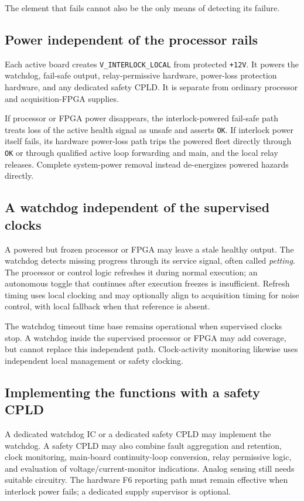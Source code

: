 The element that fails cannot also be the only means of detecting its failure.

\subsection{Power independent of the processor rails}

Each active board creates \texttt{V\_INTERLOCK\_LOCAL} from protected \texttt{+12V}. It powers the watchdog, fail-safe output, relay-permissive hardware, power-loss protection hardware, and any dedicated safety CPLD. It is separate from ordinary processor and acquisition-FPGA supplies.

If processor or FPGA power disappears, the interlock-powered fail-safe path treats loss of the active health signal as unsafe and asserts \texttt{OK}. If interlock power itself fails, its hardware power-loss path trips the powered fleet directly through \texttt{OK} or through qualified active loop forwarding and main, and the local relay releases. Complete system-power removal instead de-energizes powered hazards directly.

\subsection{A watchdog independent of the supervised clocks}

A powered but frozen processor or FPGA may leave a stale healthy output. The watchdog detects missing progress through its service signal, often called \emph{petting}. The processor or control logic refreshes it during normal execution; an autonomous toggle that continues after execution freezes is insufficient. Refresh timing uses local clocking and may optionally align to acquisition timing for noise control, with local fallback when that reference is absent.

The watchdog timeout time base remains operational when supervised clocks stop. A watchdog inside the supervised processor or FPGA may add coverage, but cannot replace this independent path. Clock-activity monitoring likewise uses independent local management or safety clocking.

\subsection{Implementing the functions with a safety CPLD}

A dedicated watchdog IC or a dedicated safety CPLD may implement the watchdog. A safety CPLD may also combine fault aggregation and retention, clock monitoring, main-board continuity-loop conversion, relay permissive logic, and evaluation of voltage/current-monitor indications. Analog sensing still needs suitable circuitry. The hardware F6 reporting path must remain effective when interlock power fails; a dedicated supply supervisor is optional.

